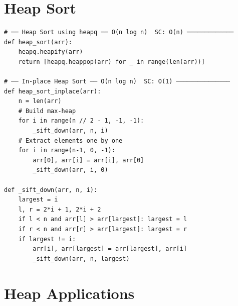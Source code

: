 \documentclass[11pt,a4paper]{report}
\begin{document}
\section{Heap Sort}

\begin{lstlisting}
# ── Heap Sort using heapq ── O(n log n)  SC: O(n) ─────────────
def heap_sort(arr):
    heapq.heapify(arr)
    return [heapq.heappop(arr) for _ in range(len(arr))]

# ── In-place Heap Sort ── O(n log n)  SC: O(1) ─────────────── 
def heap_sort_inplace(arr):
    n = len(arr)
    # Build max-heap
    for i in range(n // 2 - 1, -1, -1):
        _sift_down(arr, n, i)
    # Extract elements one by one
    for i in range(n-1, 0, -1):
        arr[0], arr[i] = arr[i], arr[0]
        _sift_down(arr, i, 0)

def _sift_down(arr, n, i):
    largest = i
    l, r = 2*i + 1, 2*i + 2
    if l < n and arr[l] > arr[largest]: largest = l
    if r < n and arr[r] > arr[largest]: largest = r
    if largest != i:
        arr[i], arr[largest] = arr[largest], arr[i]
        _sift_down(arr, n, largest)
\end{lstlisting}

\section{Heap Applications}
\end{document}
